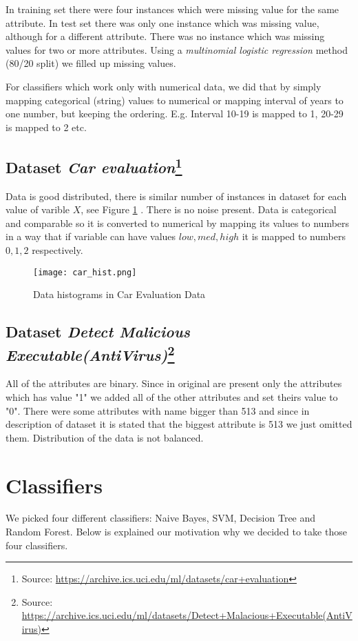 \documentclass[11pt,a4paper,titlepage]{article}
\begin{document}
In training set there were four instances which were missing value for the same attribute. In test set there was only one instance which was missing value, although for a different attribute. There was no instance which was missing values for two or more attributes.
Using a \textit{multinomial logistic regression} method (80/20 split) we filled up missing values.

For classifiers which work only with numerical data, we did that by simply mapping categorical (string) values to numerical or mapping interval of years to one number, but keeping the ordering. E.g. Interval 10-19 is mapped to 1, 20-29 is mapped to 2 etc.



\subsection{Dataset \textit{Car evaluation}\footnote{Source: \url{https://archive.ics.uci.edu/ml/datasets/car+evaluation}}}

Data is good distributed, there is similar number of instances in dataset for each value of varible $X$, see Figure \ref{fig:ced_density} . There is no noise present. Data is categorical and comparable so it is converted to numerical by mapping its values to numbers in a way that if variable can have values $low, med, high$ it is mapped to numbers $0,1,2$ respectively.

\begin{figure}
\texttt{[image: car\_hist.png]}
\caption{Data histograms in Car Evaluation Data}
\label{fig:ced_density}
\end{figure}

\subsection{Dataset \textit{Detect Malicious Executable(AntiVirus)}\footnote{Source: \url{https://archive.ics.uci.edu/ml/datasets/Detect+Malacious+Executable(AntiVirus)}}}

All of the attributes are binary. Since in original are present only the attributes which has value "1"  we added all of the other attributes and set theirs value to "0". There were some attributes with name bigger than 513 and since in description of dataset it is stated that the biggest attribute is 513 we just omitted them. Distribution of the data is not balanced.

\section{Classifiers}
We picked four different classifiers: Naive Bayes, SVM, Decision Tree and Random Forest. Below is explained our motivation why we decided to take those four classifiers.
\end{document}
